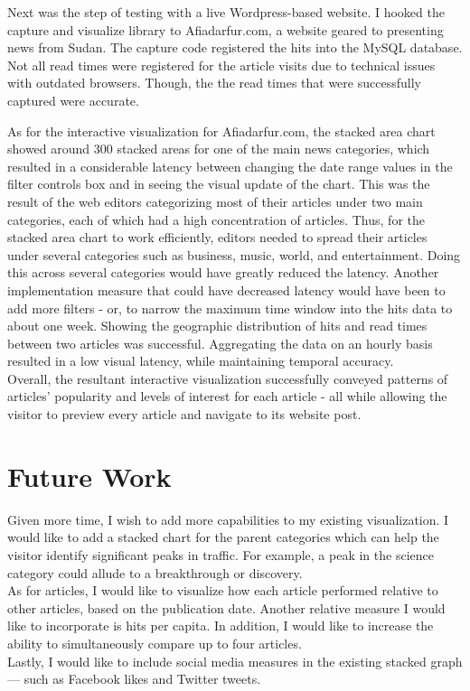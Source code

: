 \documentclass[12pt]{article}
\begin{document}
{Next was the step of testing with a live Wordpress-based website. I hooked the capture and visualize library to Afiadarfur.com, a website geared to presenting news from Sudan. The capture code registered the hits into the MySQL database. Not all read times were registered for the article visits due to technical issues with outdated browsers. Though, the the read times that were successfully captured were accurate. 
  
As for the interactive visualization for Afiadarfur.com, the stacked area chart showed around 300 stacked areas for one of the main news categories, which resulted in a considerable latency between changing the date range values in the filter controls box and in seeing the visual update of the chart. This was the result of the web editors categorizing most of their articles under two main categories, each of which had a high concentration of articles. Thus, for the stacked area chart to work efficiently, editors needed to spread their articles under several categories such as business, music, world, and entertainment. Doing this across several categories would have greatly reduced the latency. Another implementation measure that could have decreased latency would have been to add more filters - or, to narrow the maximum time window into the hits data to about one week. 
Showing the geographic distribution of hits and read times between two articles was successful. Aggregating the data on an hourly basis resulted in a low visual latency, while maintaining temporal accuracy. \\

Overall, the resultant interactive visualization successfully conveyed patterns of articles' popularity and levels of interest for each article - all while allowing the visitor to preview every article and navigate to its website post.

\newpage

\section{Future Work}
Given more time, I wish to add more capabilities to my existing visualization. I would like to add a stacked chart for the parent categories which can help the visitor identify significant peaks in traffic. For example, a peak in the science category could allude to a breakthrough or discovery. \\
As for articles, I would like to visualize how each article performed relative to other articles, based on the publication date. Another relative measure I would like to incorporate is hits per capita. In addition, I would like to increase the ability to simultaneously compare up to four articles. \\
Lastly, I would like to include social media measures in the existing stacked graph --- such as Facebook likes and Twitter tweets.

}
\end{document}
